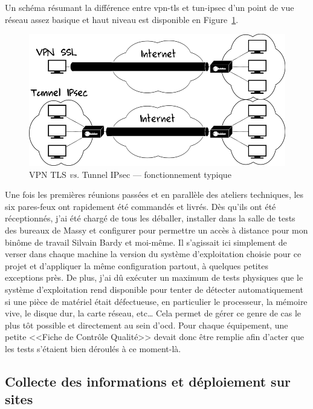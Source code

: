 \documentclass[12pt, oneside, a4paper, titlepage]{report}
\begin{document}
Un schéma résumant la différence entre \gls{vpn-tls} et \gls{tun-ipsec} d'un
point de vue réseau assez basique et haut niveau est disponible en
Figure~\ref{fig:misc/tls-vs-ipsec}.

\begin{figure}[h!]
    \centering
    \includegraphics[width = 0.8\linewidth]{img/misc/tls-vs-ipsec.png}
    \caption{VPN TLS \textit{vs.} Tunnel IPsec --- fonctionnement typique}%
    \label{fig:misc/tls-vs-ipsec}
\end{figure}

Une fois les premières réunions passées et en parallèle des ateliers techniques,
les six pares-feux ont rapidement été commandés et livrés. Dès qu'ils ont été
réceptionnés, j'ai été chargé de tous les déballer, installer dans la salle de
tests des bureaux de Massy et configurer pour permettre un accès à distance pour
mon binôme de travail Silvain Bardy et moi-même. Il s'agissait ici simplement de
verser dans chaque machine la version du système d'exploitation choisie pour ce
projet et d'appliquer la même configuration partout, à quelques petites
exceptions près. De plus, j'ai dû exécuter un maximum de tests physiques que le
système d'exploitation rend disponible pour tenter de détecter automatiquement
si une pièce de matériel était défectueuse, en particulier le processeur, la
mémoire vive, le disque dur, la carte réseau, etc\ldots{} Cela permet de gérer
ce genre de cas le plus tôt possible et directement au sein d'\gls{ocd}. Pour
chaque équipement, une petite <<Fiche de Contrôle Qualité>> devait donc être
remplie afin d'acter que les tests s'étaient bien déroulés à ce moment-là.

\subsection{Collecte des informations et déploiement sur sites}%
\label{sub:mission::main::collec}
\end{document}
